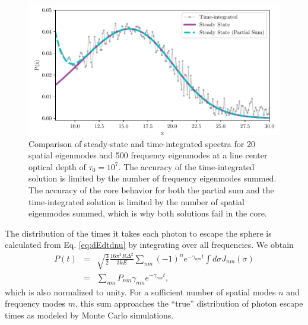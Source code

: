 \documentclass{aastex63}
\newcommand{\be}{\begin{eqnarray}}
\newcommand{\ee}{\end{eqnarray}}
\begin{document}
\begin{figure}
    \centering
    \includegraphics{steadystate.pdf}
    \caption{Comparison of steady-state and time-integrated spectra for 20 spatial eigenmodes and 500 frequency eigenmodes at a line center optical depth of $\tau_0=10^7$. The accuracy of the time-integrated solution is limited by the number of frequency eigenmodes summed. The accuracy of the core behavior for both the partial sum and the time-integrated solution is limited by the number of spatial eigenmodes summed, which is why both solutions fail in the core.}
    \label{fig:steadystate}
\end{figure}

The distribution of the times it takes each photon to escape the sphere is calculated from Eq. \ref{eq:dEdtdnu} by integrating over all frequencies. We obtain
\be
P(t)  & = & \sqrt{\frac{3}{2}} \frac{16\pi^2 R \Delta^2 }{3kE}     \sum_{nm} (-1)^n  e^{-\gamma_{nm}t} \int d\sigma J_{nm}(\sigma) 
\nonumber \\ & = &  \sum_{nm} P_{nm} \gamma_{nm} e^{-\gamma_{nm}t},
\label{eq:waittime}
\ee
which is also normalized to unity. For a sufficient number of spatial modes $n$ and frequency modes $m$, this sum approaches the ``true'' distribution of photon escape times as modeled by Monte Carlo simulations.
\end{document}
